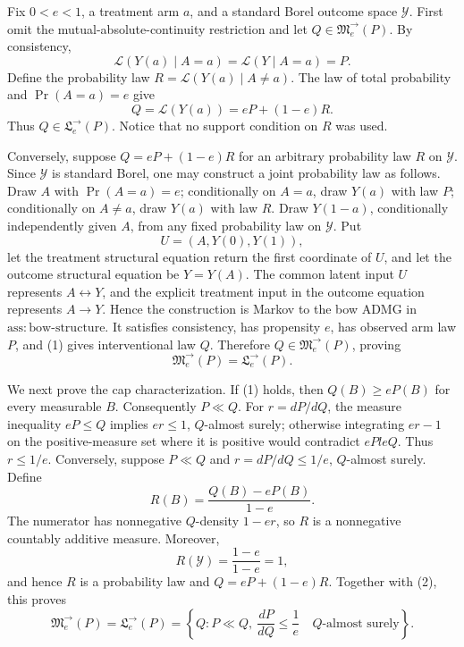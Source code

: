 Fix \(0<e<1\), a treatment arm \(a\), and a standard Borel outcome space \(\mathcal Y\).   First omit the mutual-absolute-continuity restriction and let \(Q\in\mathfrak M^{\to}_e(P)\).  By consistency,
\[
 \mathcal L(Y(a)\mid A=a)=\mathcal L(Y\mid A=a)=P.
\]
Define the probability law \(R=\mathcal L(Y(a)\mid A\ne a)\).  The law of total probability and \(\Pr(A=a)=e\) give
\[
 Q=\mathcal L(Y(a))=eP+(1-e)R. \tag{1}
\]
Thus \(Q\in\mathfrak L^{\to}_e(P)\).  Notice that no support condition on \(R\) was used.

Conversely, suppose \(Q=eP+(1-e)R\) for an arbitrary probability law \(R\) on \(\mathcal Y\).  Since \(\mathcal Y\) is standard Borel, one may construct a joint probability law as follows.  Draw \(A\) with \(\Pr(A=a)=e\); conditionally on \(A=a\), draw \(Y(a)\) with law \(P\); conditionally on \(A\ne a\), draw \(Y(a)\) with law \(R\).  Draw \(Y(1-a)\), conditionally independently given \(A\), from any fixed probability law on \(\mathcal Y\).  Put
\[
 U=(A,Y(0),Y(1)),
\]
let the treatment structural equation return the first coordinate of \(U\), and let the outcome structural equation be \(Y=Y(A)\).  The common latent input \(U\) represents \(A\leftrightarrow Y\), and the explicit treatment input in the outcome equation represents \(A\to Y\).  Hence the construction is Markov to the bow ADMG in \(\mathrm{ass:bow\text{-}structure}\).  It satisfies consistency, has propensity \(e\), has observed arm law \(P\), and (1) gives interventional law \(Q\).  Therefore \(Q\in\mathfrak M^{\to}_e(P)\), proving
\[
 \mathfrak M^{\to}_e(P)=\mathfrak L^{\to}_e(P). \tag{2}
\]

We next prove the cap characterization.  If (1) holds, then \(Q(B)\ge eP(B)\) for every measurable \(B\).  Consequently \(P\ll Q\).  For \(r=dP/dQ\), the measure inequality \(eP\le Q\) implies \(er\le1\), \(Q\)-almost surely; otherwise integrating \(er-1\) on the positive-measure set where it is positive would contradict \(ePle Q\).  Thus \(r\le1/e\).  Conversely, suppose \(P\ll Q\) and \(r=dP/dQ\le1/e\), \(Q\)-almost surely.  Define
\[
 R(B)=\frac{Q(B)-eP(B)}{1-e}.
\]
The numerator has nonnegative \(Q\)-density \(1-er\), so \(R\) is a nonnegative countably additive measure.  Moreover,
\[
 R(\mathcal Y)=\frac{1-e}{1-e}=1,
\]
and hence \(R\) is a probability law and \(Q=eP+(1-e)R\).  Together with (2), this proves
\[
 \mathfrak M^{\to}_e(P)=\mathfrak L^{\to}_e(P)
 =\left\{Q:P\ll Q,\ \frac{dP}{dQ}\le\frac1e\quad Q\text{-almost surely}\right\}. \tag{3}
\]